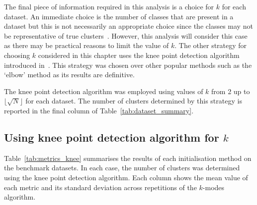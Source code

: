 The final piece of information required in this analysis is a choice for \(k\)
for each dataset. An immediate choice is the number of classes that are present
in a dataset but this is not necessarily an appropriate choice since the classes
may not be representative of true clusters~\cite{Memoli2011}. However, this
analysis will consider this case as there may be practical reasons to limit the
value of \(k\). The other strategy for choosing \(k\) considered in this chapter
uses the knee point detection algorithm introduced in~\cite{Satopaa2011}. This
strategy was chosen over other popular methods such as the `elbow' method as its
results are definitive.

The knee point detection algorithm was employed using values of \(k\) from 2 up
to \(\lfloor\sqrt N\rfloor\) for each dataset. The number of clusters determined
by this strategy is reported in the final column of
Table~\ref{tab:dataset_summary}.


\subsection{Using knee point detection algorithm for \(k\)}\label{subsec:knee}

Table~\ref{tab:metrics_knee} summarises the results of each initialisation
method on the benchmark datasets. In each case, the number of clusters was
determined using the knee point detection algorithm. Each column shows the mean
value of each metric and its standard deviation across
repetitions of the \(k\)-modes
algorithm.


